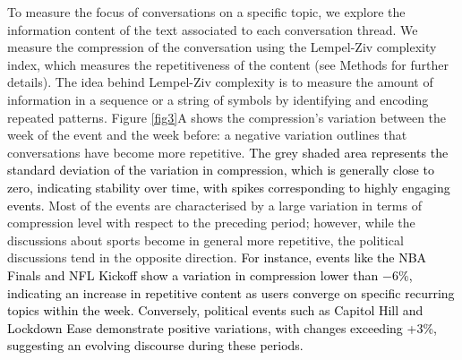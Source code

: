 \documentclass[fleqn,10pt]{wlscirep}
\newcommand{\new}[1]{\textcolor{black}{#1}}
\begin{document}
To measure the focus of conversations on a specific topic, we explore the information content of the text associated to each conversation thread.
We measure the compression of the conversation using the Lempel-Ziv complexity index, which measures the repetitiveness of the content (see Methods for further details). 
The idea behind Lempel-Ziv complexity is to measure the amount of information in a sequence or a string of symbols by identifying and encoding repeated patterns. 
Figure \ref{fig3}A shows the compression's variation between the week of the event and the week before: a negative variation outlines that conversations have become more repetitive. 
\new{
The grey shaded area represents the standard deviation of the variation in compression, which is generally close to zero, indicating stability over time, with spikes corresponding to highly engaging events.
}
Most of the events are characterised by a large variation in terms of compression level with respect to the preceding period; however, while the discussions about sports become in general more repetitive, the political discussions tend in the opposite direction.
\new{
For instance, events like the NBA Finals and NFL Kickoff show a variation in compression lower than $-6\%$, indicating an increase in repetitive content as users converge on specific recurring topics within the week.
Conversely, political events such as Capitol Hill and Lockdown Ease demonstrate positive variations, with changes exceeding +3\%, suggesting an evolving discourse during these periods.
}
\end{document}
